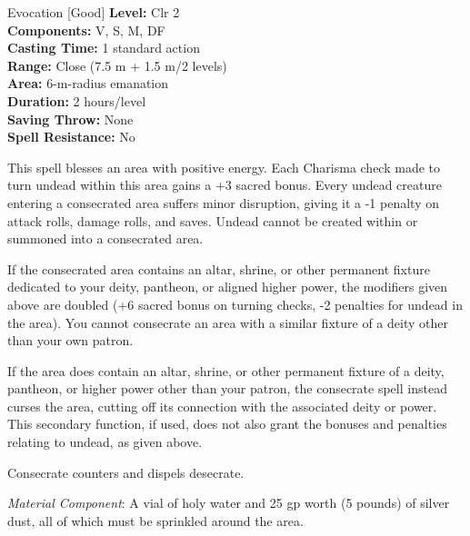 {Evocation [Good]}
{
	\textbf{Level:}
	Clr 2\\
	\textbf{Components:}
	V, S, M, DF\\
	\textbf{Casting Time:}
	1 standard action\\
	\textbf{Range:}
	Close (7.5 m + 1.5 m/2 levels)\\
	\textbf{Area:}
	6-m-radius emanation\\
	\textbf{Duration:}
	2 hours/level\\
	\textbf{Saving Throw:}
	None\\
	\textbf{Spell Resistance:}
	No\\
}
{
	This spell blesses an area with positive energy. Each Charisma check made to turn undead within this area gains a +3 sacred bonus. Every undead creature entering a consecrated area suffers minor disruption, giving it a -1 penalty on attack rolls, damage rolls, and saves. Undead cannot be created within or summoned into a consecrated area.

	If the consecrated area contains an altar, shrine, or other permanent fixture dedicated to your deity, pantheon, or aligned higher power, the modifiers given above are doubled (+6 sacred bonus on turning checks, -2 penalties for undead in the area). You cannot consecrate an area with a similar fixture of a deity other than your own patron.

	If the area does contain an altar, shrine, or other permanent fixture of a deity, pantheon, or higher power other than your patron, the consecrate spell instead curses the area, cutting off its connection with the associated deity or power. This secondary function, if used, does not also grant the bonuses and penalties relating to undead, as given above.

	Consecrate counters and dispels desecrate.

	\textit{Material Component}:
	A vial of holy water and 25 gp worth (5 pounds) of silver dust, all of which must be sprinkled around the area.

}
